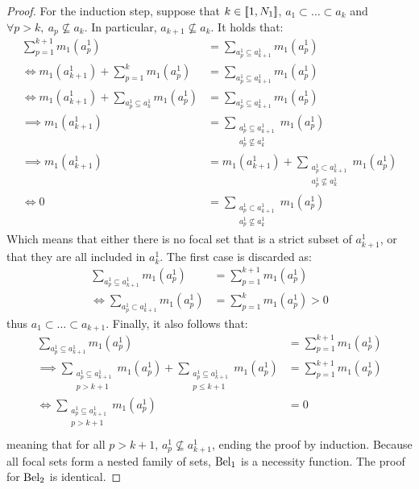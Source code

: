 \begin{proof}
    For the induction step, suppose that $k\in[\![1,N_1]\!]$,  $a_1\subset\ldots\subset a_k$ and $\forall p>k,~a_p\not\subseteq a_k$. In particular, $a_{k+1}\not\subseteq a_k$. It holds that:
    \begin{align*}
        \sum_{p=1}^{k+1}m_1(a^1_p) &= \sum_{a^1_p\subseteq a^1_{k+1}}m_1(a^1_p)\\
        \Leftrightarrow m_1(a^1_{k+1}) + \sum_{p=1}^{k} m_1(a^1_p) &= \sum_{a^1_p\subseteq a^1_{k+1}}m_1(a^1_p)\\
        \Leftrightarrow m_1(a^1_{k+1}) + \sum_{a^1_p\subseteq a^1_k} m_1(a^1_p) &= \sum_{a^1_p\subseteq a^1_{k+1}}m_1(a^1_p)\\
        \implies m_1(a^1_{k+1}) &= \sum_{\substack{a^1_p\subseteq a^1_{k+1} \\ a^1_p\not\subseteq a^1_k}} m_1(a^1_p)\\
        \implies m_1(a^1_{k+1}) &= m_1(a^1_{k+1}) + \sum_{\substack{a^1_p\subset a^1_{k+1} \\ a^1_p\not\subseteq a^1_k}} m_1(a^1_p)\\
        \Leftrightarrow 0 &= \sum_{\substack{a^1_p\subset a^1_{k+1} \\ a^1_p\not\subseteq a^1_k}} m_1(a^1_p)
    \end{align*}
    Which means that either there is no focal set that is a strict subset of $a^1_{k+1}$, or that they are all included in $a^1_{k}$. The first case is discarded as:
    \begin{align*}
        \sum_{a^1_p\subseteq a^1_{k+1}}m_1(a^1_p) &= \sum_{p=1}^{k+1}m_1(a^1_p)\\
        \Leftrightarrow \sum_{a^1_p\subset a^1_{k+1}}m_1(a^1_p) &= \sum_{p=1}^{k}m_1(a^1_p)>0
    \end{align*}
    thus $a_1\subset\ldots\subset a_{k+1}$.
    Finally, it also follows that:
    \begin{align*}
        \sum_{a^1_p\subseteq a^1_{k+1}}m_1(a^1_p) &= \sum_{p=1}^{k+1}m_1(a^1_p)\\
        \implies \sum_{\substack{a^1_p\subseteq a^1_{k+1} \\ p>k+1}} m_1(a^1_p) + \sum_{\substack{a^1_p\subseteq a^1_{k+1} \\ p\leqslant k+1}} m_1(a^1_p) &= \sum_{p=1}^{k+1}m_1(a^1_p)\\
        \Leftrightarrow \sum_{\substack{a^1_p\subseteq a^1_{k+1} \\ p>k+1}} m_1(a^1_p) &= 0\\
    \end{align*}
    meaning that for all $p>k+1$, $a^1_p\not\subseteq a^1_{k+1}$, ending the proof by induction. Because all focal sets form a nested family of sets, $\mathrm{Bel}_1$ is a necessity function. The proof for $\mathrm{Bel}_2$ is identical.
\end{proof}

